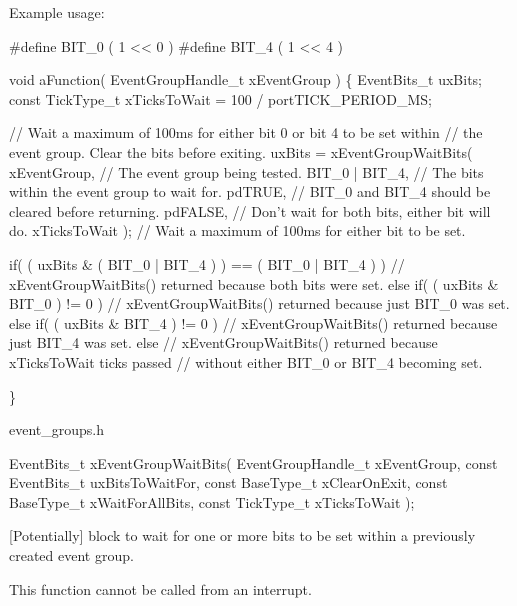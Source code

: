 Example usage\+: 
\begin{DoxyPre}
#define BIT\_0 ( 1 << 0 )
#define BIT\_4 ( 1 << 4 )\end{DoxyPre}



\begin{DoxyPre}  void aFunction( EventGroupHandle\_t xEventGroup )
  \{
  EventBits\_t uxBits;
  const TickType\_t xTicksToWait = 100 / portTICK\_PERIOD\_MS;
\begin{DoxyVerb} // Wait a maximum of 100ms for either bit 0 or bit 4 to be set within
 // the event group.  Clear the bits before exiting.
 uxBits = xEventGroupWaitBits(
             xEventGroup,    // The event group being tested.
             BIT_0 | BIT_4,  // The bits within the event group to wait for.
             pdTRUE,         // BIT_0 and BIT_4 should be cleared before returning.
             pdFALSE,        // Don't wait for both bits, either bit will do.
             xTicksToWait ); // Wait a maximum of 100ms for either bit to be set.

 if( ( uxBits & ( BIT_0 | BIT_4 ) ) == ( BIT_0 | BIT_4 ) )
 {
     // xEventGroupWaitBits() returned because both bits were set.
 }
 else if( ( uxBits & BIT_0 ) != 0 )
 {
     // xEventGroupWaitBits() returned because just BIT_0 was set.
 }
 else if( ( uxBits & BIT_4 ) != 0 )
 {
     // xEventGroupWaitBits() returned because just BIT_4 was set.
 }
 else
 {
     // xEventGroupWaitBits() returned because xTicksToWait ticks passed
     // without either BIT_0 or BIT_4 becoming set.
 }
\end{DoxyVerb}

  \}
  \end{DoxyPre}


event\+\_\+groups.\+h 
\begin{DoxyPre}
   EventBits\_t xEventGroupWaitBits(     EventGroupHandle\_t xEventGroup,
                                    const EventBits\_t uxBitsToWaitFor,
                                    const BaseType\_t xClearOnExit,
                                    const BaseType\_t xWaitForAllBits,
                                    const TickType\_t xTicksToWait );
\end{DoxyPre}


\mbox{[}Potentially\mbox{]} block to wait for one or more bits to be set within a previously created event group.

This function cannot be called from an interrupt.


